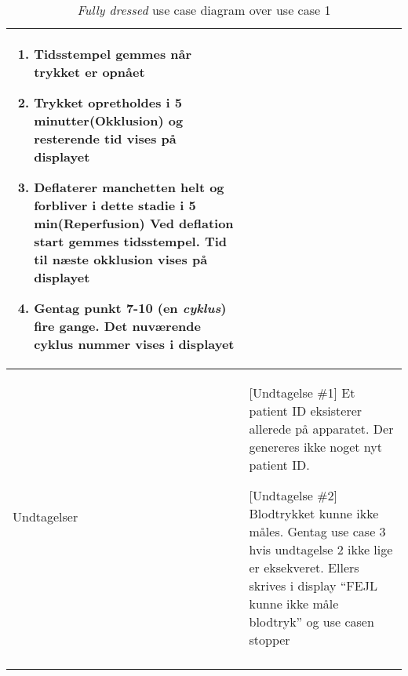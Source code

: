 \begin{center}
\begin{longtable}{ | p{} | p{}| }
\begin{enumerate}
				\item Tidsstempel gemmes når trykket er opnået
				\item Trykket opretholdes i 5 minutter(Okklusion) og resterende tid vises på displayet
				\item Deflaterer manchetten helt og forbliver i dette stadie i 5 min(Reperfusion) Ved deflation start gemmes tidsstempel. Tid til næste okklusion vises på displayet
				\item Gentag punkt 7-10 (en \textit{cyklus}) fire gange. Det nuværende cyklus nummer vises i displayet
			\end{enumerate} \\ 
			\hline
			Undtagelser & [Undtagelse \#1] Et patient ID eksisterer allerede på apparatet. Der genereres ikke noget nyt patient ID.
			
			[Undtagelse \#2] Blodtrykket kunne ikke måles. Gentag use case 3 hvis undtagelse 2 ikke lige er eksekveret. Ellers skrives i display “FEJL kunne ikke måle blodtryk” og use casen stopper  \\
			\hline
			\caption{\textit{Fully dressed} use case diagram over use case 1}
		\end{longtable}
		
	\end{center}